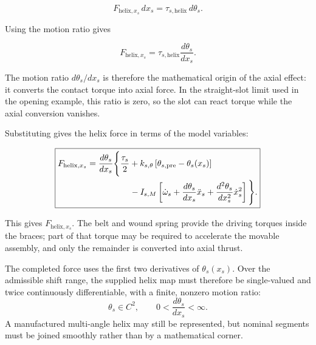 \documentclass[11pt]{report}
\numberwithin{equation}{section}
\begin{document}
\begin{equation}
    F_{\mathrm{helix},x_s}\,dx_s
    =
    \tau_{s,\mathrm{helix}}\,d\theta_s.
    \label{eq:secondary_helix_work_conversion}
\end{equation}

Using the motion ratio gives

\begin{equation}
    F_{\mathrm{helix},x_s}
    =
    \tau_{s,\mathrm{helix}}
    \frac{d\theta_s}{dx_s}.
    \label{eq:secondary_helix_force_conversion}
\end{equation}

The motion ratio \(d\theta_s/dx_s\) is therefore the mathematical origin of
the axial effect: it converts the contact torque into axial force. In the
straight-slot limit used in the opening example, this ratio is zero, so the
slot can react torque while the axial conversion vanishes.

Substituting  gives the helix force in
terms of the model variables:

\begin{equation}
\boxed{
\begin{aligned}
    F_{\mathrm{helix},x_s}
    ={}&
    \frac{d\theta_s}{dx_s}
    \Bigg\{
        \frac{\tau_s}{2}
        +
        k_{s,\theta}
        \left[
            \theta_{s,\mathrm{pre}}-\theta_s(x_s)
        \right]
    \\
    &\hspace{3.7em}
        -I_{s,M}
        \left[
            \dot\omega_s
            +
            \frac{d\theta_s}{dx_s}\ddot x_s
            +
            \frac{d^2\theta_s}{dx_s^2}\dot x_s^2
        \right]
    \Bigg\}.
\end{aligned}
}
    \label{eq:secondary_helix_closing_force}
\end{equation}

This gives \(F_{\mathrm{helix},x_s}\). The belt and wound spring provide the
driving torques inside the braces; part of that torque may be required to
accelerate the movable assembly, and only the remainder is converted into
axial thrust.

\begin{remarkbox}
The completed force uses the first two derivatives of \(\theta_s(x_s)\).
Over the admissible shift range, the supplied helix map must therefore be
single-valued and twice continuously differentiable, with a finite, nonzero
motion ratio:
\[
    \theta_s\in C^2,
    \qquad
    0<
    \frac{d\theta_s}{dx_s}
    <\infty.
\]
A manufactured multi-angle helix may still be represented, but nominal
segments must be joined smoothly rather than by a mathematical corner.
\end{remarkbox}
\end{document}
